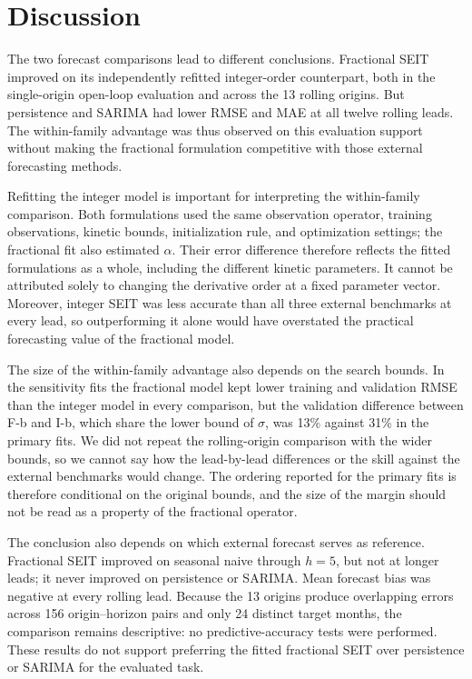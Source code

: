 \documentclass[pdflatex,sn-mathphys-ay,lineno]{sn-jnl}
\begin{document}
\section{Discussion}

The two forecast comparisons lead to different conclusions. Fractional SEIT improved on its independently refitted integer-order counterpart, both in the single-origin open-loop evaluation and across the 13 rolling origins. But persistence and SARIMA had lower RMSE and MAE at all twelve rolling leads. The within-family advantage was thus observed on this evaluation support without making the fractional formulation competitive with those external forecasting methods.

Refitting the integer model is important for interpreting the within-family comparison. Both formulations used the same observation operator, training observations, kinetic bounds, initialization rule, and optimization settings; the fractional fit also estimated $\alpha$. Their error difference therefore reflects the fitted formulations as a whole, including the different kinetic parameters. It cannot be attributed solely to changing the derivative order at a fixed parameter vector. Moreover, integer SEIT was less accurate than all three external benchmarks at every lead, so outperforming it alone would have overstated the practical forecasting value of the fractional model.

The size of the within-family advantage also depends on the search bounds. In the sensitivity fits the fractional model kept lower training and validation RMSE than the integer model in every comparison, but the validation difference between F-b and I-b, which share the lower bound of $\sigma$, was 13\% against 31\% in the primary fits. We did not repeat the rolling-origin comparison with the wider bounds, so we cannot say how the lead-by-lead differences or the skill against the external benchmarks would change. The ordering reported for the primary fits is therefore conditional on the original bounds, and the size of the margin should not be read as a property of the fractional operator.

The conclusion also depends on which external forecast serves as reference. Fractional SEIT improved on seasonal naive through $h=5$, but not at longer leads; it never improved on persistence or SARIMA. Mean forecast bias was negative at every rolling lead. Because the 13 origins produce overlapping errors across 156 origin--horizon pairs and only 24 distinct target months, the comparison remains descriptive: no predictive-accuracy tests were performed. These results do not support preferring the fitted fractional SEIT over persistence or SARIMA for the evaluated task.
\end{document}
